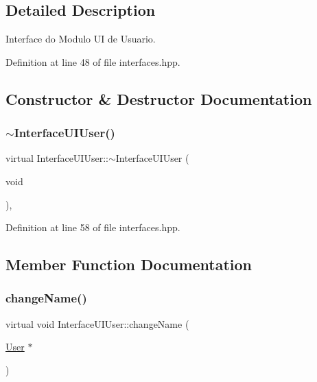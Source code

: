 \subsection{Detailed Description}
Interface do Modulo UI de Usuario. 

Definition at line 48 of file interfaces.\+hpp.



\subsection{Constructor \& Destructor Documentation}
\mbox{\label{class_interface_u_i_user_a1a3ad0594545402e992832378da51171}} 
\subsubsection{\texorpdfstring{$\sim$\+Interface\+U\+I\+User()}{~InterfaceUIUser()}}
{\footnotesize\ttfamily virtual Interface\+U\+I\+User\+::$\sim$\+Interface\+U\+I\+User (\begin{DoxyParamCaption}\item[{void}]{ }\end{DoxyParamCaption})\hspace{0.3cm}{\ttfamily [inline]}, {\ttfamily [virtual]}}



Definition at line 58 of file interfaces.\+hpp.



\subsection{Member Function Documentation}
\mbox{\label{class_interface_u_i_user_a2d8e9c81dabab905f06eacdc474d928d}} 
\subsubsection{\texorpdfstring{change\+Name()}{changeName()}}
{\footnotesize\ttfamily virtual void Interface\+U\+I\+User\+::change\+Name (\begin{DoxyParamCaption}\item[{\hyperlink{class_user}{User} $\ast$}]{ }\end{DoxyParamCaption})\hspace{0.3cm}{\ttfamily [pure virtual]}}



